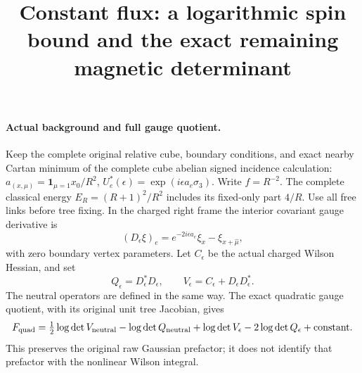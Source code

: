 \documentclass[11pt]{article}
\title{Constant flux: a logarithmic spin bound and the exact remaining magnetic determinant}\author{}\date{}
\begin{document}
\maketitle
\paragraph{Actual background and full gauge quotient.}
Keep the complete original relative cube, boundary conditions, and exact
nearby Cartan minimum of the complete cube abelian signed incidence calculation:
$a_{(x,\mu)}=\mathbf1_{\mu=1}x_0/R^2$,
$U_e^*(\epsilon)=\exp(i\epsilon a_e\sigma_3)$.
Write $f=R^{-2}$. The complete classical energy
$E_R=(R+1)^2/R^2$ includes its fixed-only part $4/R$.
Use all free links before tree fixing.
In the charged right frame the interior covariant gauge derivative is
\[
 (D_\epsilon\xi)_e=e^{-2i\epsilon a_e}\xi_x-\xi_{x+\hat\mu},
\]
with zero boundary vertex parameters. Let $C_\epsilon$ be the actual
charged Wilson Hessian, and set
\[
 Q_\epsilon=D_\epsilon^*D_\epsilon,\qquad
 V_\epsilon=C_\epsilon+D_\epsilon D_\epsilon^*.
\]
The neutral operators are defined in the same way. The exact quadratic
gauge quotient, with its original unit tree Jacobian, gives
\[
 F_{\rm quad}=\tfrac12\log\det V_{\rm neutral}
 -\log\det Q_{\rm neutral}
 +\log\det V_\epsilon-2\log\det Q_\epsilon+\text{constant}.
\]
This preserves the original raw Gaussian prefactor; it does not identify
that prefactor with the nonlinear Wilson integral.
\end{document}
